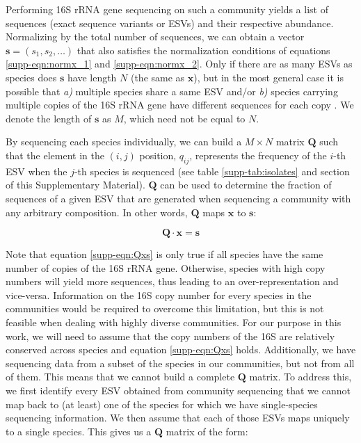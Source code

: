 \documentclass[a4paper,10pt]{article}
\begin{document}
Performing 16S rRNA gene sequencing on such a community yields a list of
sequences (exact sequence variants or ESVs) and their respective abundance.
Normalizing by the total number of sequences, we can obtain a vector $\mathbf{s}
= \left( s_1, s_2, \dotsc \right)$ that also satisfies the normalization
conditions of equations \ref{supp-eqn:normx_1} and \ref{supp-eqn:normx_2}.
Only if there are as many ESVs as species does $\mathbf{s}$ have length $N$
(the same as $\mathbf{x}$), but in the most general case it is possible that
\textit{a)} multiple species share a same ESV and/or \textit{b)} species carrying
multiple copies
of the 16S rRNA gene have different sequences for each copy \cite{Vetrovsky2013}. We denote
the length of $\mathbf{s}$ as $M$, which need not be equal to $N$.

By sequencing each species individually, we can build a $M \times N$ 
matrix $\mathbf{Q}$ such
that the element in the $(i,j)$ position, $q_{ij}$, represents the frequency of
the $i$-th ESV when the $j$-th species is sequenced (see table
\ref{supp-tab:isolates} and section  of
this Supplementary Material).
$\mathbf{Q}$ can be used
to determine the fraction of sequences of a given ESV that are generated when
sequencing a community with any arbitrary composition. In other words,
$\mathbf{Q}$ maps $\mathbf{x}$ to $\mathbf{s}$:

\begin{equation}
\mathbf{Q} \cdot \mathbf{x} = \mathbf{s}
\label{supp-eqn:Qxs}
\end{equation}

Note that equation \ref{supp-eqn:Qxs} is only true if all species have the same
number of copies of the 16S rRNA gene. Otherwise, species with high copy numbers
will yield more sequences, thus leading to an over-representation and vice-versa.
Information on the 16S copy number for every species in the communities would be
required to overcome this limitation, but this is not feasible when dealing with
highly diverse communities. For our purpose in this
work, we will need to assume that the copy numbers of the 16S are relatively
conserved across species and equation \ref{supp-eqn:Qxs} holds. Additionally,
we have sequencing data from a subset of the species in our
communities, but not from all of them. This means that we cannot build a complete
$\mathbf{Q}$ matrix. To address this, we first identify every ESV obtained
from community sequencing that we cannot map back to (at least) one of the
species for which we have single-species sequencing information. We then
assume that each
of those ESVs maps uniquely to a single species. This gives us a $\mathbf{Q}$
matrix of the form:
\end{document}
